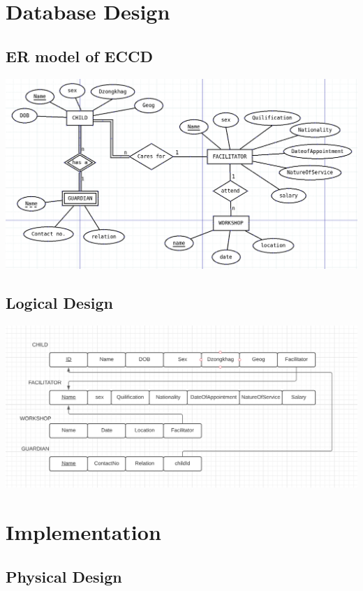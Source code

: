 \documentclass{scrreprt}
\begin{document}
	
\chapter{Database Design}
\section{ER model of ECCD}
	
	\includegraphics[scale=.3]{er}
	
\section{Logical Design}

	\includegraphics[width = \linewidth]{schema}


\chapter{Implementation}
	\section{Physical Design}
	
\end{document}

